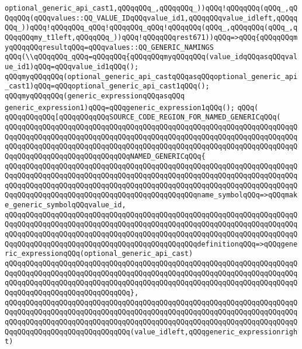\verb|optional_generic_api_cast1,qQQqqQQq_,qQQqqQQq_))qQQq!qQQqqQQq(qQQq_,qQQqqQQq(qQQqvalues::QQ_VALUE_IDqQQqvalue_id1,qQQqqQQqvalue_idleft,qQQqqQQq_))qQQq!qQQqqQQq_qQQq!qQQqqQQq_qQQq!qQQqqQQq(qQQq_,qQQqqQQq(qQQq_,qQQqqQQqmy_t1left,qQQqqQQq_))qQQq!qQQqqQQqrest671))qQQq=>qQQq{qQQqqQQqmyqQQqqQQqresultqQQq=qQQqvalues::QQ_GENERIC_NAMINGS|\newline
\verb|qQQq(\\qQQqqQQq_qQQq=qQQqqQQq{qQQqqQQqmyqQQqqQQq(value_idqQQqasqQQqvalue_id1)qQQq=qQQqvalue_id1qQQq();|\newline
\verb|qQQqmyqQQqqQQq(optional_generic_api_castqQQqasqQQqoptional_generic_api_cast1)qQQq=qQQqoptional_generic_api_cast1qQQq();|\newline
\verb|qQQqmyqQQqqQQq(generic_expressionqQQqasqQQq|\newline
\verb|generic_expression1)qQQq=qQQqgeneric_expression1qQQq();|\newline
\verb|qQQq(|\newline
\verb|qQQqqQQqqQQq[qQQqqQQqqQQqSOURCE_CODE_REGION_FOR_NAMED_GENERICqQQq(|\newline
\verb|qQQqqQQqqQQqqQQqqQQqqQQqqQQqqQQqqQQqqQQqqQQqqQQqqQQqqQQqqQQqqQQqqQQqqQQqqQQqqQQqqQQqqQQqqQQqqQQqqQQqqQQqqQQqqQQqqQQqqQQqqQQqqQQqqQQqqQQqqQQqqQQqqQQqqQQqqQQqqQQqqQQqqQQqqQQqqQQqqQQqqQQqqQQqqQQqqQQqqQQqqQQqqQQqqQQqqQQqqQQqqQQqqQQqqQQqqQQqqQQqNAMED_GENERICqQQq{|\newline
\verb|qQQqqQQqqQQqqQQqqQQqqQQqqQQqqQQqqQQqqQQqqQQqqQQqqQQqqQQqqQQqqQQqqQQqqQQqqQQqqQQqqQQqqQQqqQQqqQQqqQQqqQQqqQQqqQQqqQQqqQQqqQQqqQQqqQQqqQQqqQQqqQQqqQQqqQQqqQQqqQQqqQQqqQQqqQQqqQQqqQQqqQQqqQQqqQQqqQQqqQQqqQQqqQQqqQQqqQQqqQQqqQQqqQQqqQQqqQQqqQQqqQQqqQQqqQQqqQQqname_symbolqQQq=>qQQqmake_generic_symbolqQQqvalue_id,|\newline
\verb|qQQqqQQqqQQqqQQqqQQqqQQqqQQqqQQqqQQqqQQqqQQqqQQqqQQqqQQqqQQqqQQqqQQqqQQqqQQqqQQqqQQqqQQqqQQqqQQqqQQqqQQqqQQqqQQqqQQqqQQqqQQqqQQqqQQqqQQqqQQqqQQqqQQqqQQqqQQqqQQqqQQqqQQqqQQqqQQqqQQqqQQqqQQqqQQqqQQqqQQqqQQqqQQqqQQqqQQqqQQqqQQqqQQqqQQqqQQqqQQqqQQqqQQqqQQqqQQqdefinitionqQQq=>qQQqgeneric_expressionqQQq(optional_generic_api_cast)|\newline
\verb|qQQqqQQqqQQqqQQqqQQqqQQqqQQqqQQqqQQqqQQqqQQqqQQqqQQqqQQqqQQqqQQqqQQqqQQqqQQqqQQqqQQqqQQqqQQqqQQqqQQqqQQqqQQqqQQqqQQqqQQqqQQqqQQqqQQqqQQqqQQqqQQqqQQqqQQqqQQqqQQqqQQqqQQqqQQqqQQqqQQqqQQqqQQqqQQqqQQqqQQqqQQqqQQqqQQqqQQqqQQqqQQqqQQqqQQqqQQqqQQq},|\newline
\verb|qQQqqQQqqQQqqQQqqQQqqQQqqQQqqQQqqQQqqQQqqQQqqQQqqQQqqQQqqQQqqQQqqQQqqQQqqQQqqQQqqQQqqQQqqQQqqQQqqQQqqQQqqQQqqQQqqQQqqQQqqQQqqQQqqQQqqQQqqQQqqQQqqQQqqQQqqQQqqQQqqQQqqQQqqQQqqQQqqQQqqQQqqQQqqQQqqQQqqQQqqQQqqQQqqQQqqQQqqQQqqQQqqQQqqQQqqQQqqQQq(value_idleft,qQQqgeneric_expressionright)|\newline
